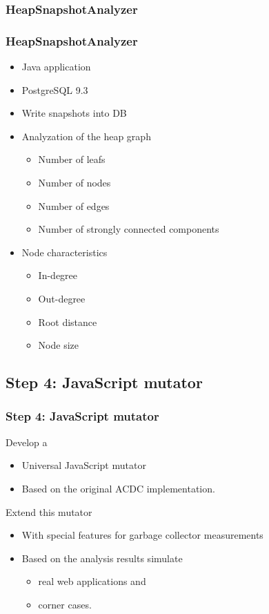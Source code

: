 \documentclass[xcolor=x11names,compress]{beamer}
\begin{document}
	\subsubsection{HeapSnapshotAnalyzer}
	\begin{frame}
		\frametitle{HeapSnapshotAnalyzer}
		\begin{itemize}
			\item Java application
			\item PostgreSQL 9.3
			\item Write snapshots into DB
			
			\pause
			
			\item Analyzation of the heap graph
			\begin{itemize}
				 \item Number of leafs
				 \item Number of nodes
				 \item Number of edges
				 \item Number of strongly connected components
			\end{itemize}
			
			\pause 
			
			\item Node characteristics
			\begin{itemize} 
				 \item In-degree
				 \item Out-degree
				 \item Root distance
				 \item Node size 
			\end{itemize}
		\end{itemize} 
	\end{frame}
	
	\subsection{Step 4: JavaScript mutator}
	\begin{frame}
		\frametitle{Step 4: JavaScript mutator}
		Develop a 
		\begin{itemize}
			\item Universal JavaScript mutator
			\item Based on the original ACDC implementation.
		\end{itemize}
		
		\pause
		
		Extend this mutator
		\begin{itemize}
			\item With special features for garbage collector measurements
			\item Based on the analysis results simulate
			\begin{itemize}
				\item real web applications and
				\item corner cases. 
			\end{itemize}
		\end{itemize}
	\end{frame}
	
\end{document}
